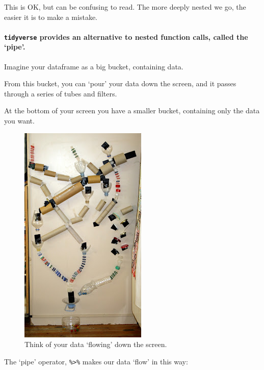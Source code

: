 \documentclass[]{article}
\let\oldparagraph\paragraph
\renewcommand{\paragraph}[1]{\oldparagraph{#1}\mbox{}}
\begin{document}
This is OK, but can be confusing to read. The more deeply nested we go, the
easier it is to make a mistake.

\hypertarget{tidyverse-provides-an-alternative-to-nested-function-calls-called-the-pipe.}{%
\paragraph{\texorpdfstring{\texttt{tidyverse} provides an alternative to nested function calls, called the `pipe'.}{tidyverse provides an alternative to nested function calls, called the `pipe'.}}\label{tidyverse-provides-an-alternative-to-nested-function-calls-called-the-pipe.}}

Imagine your dataframe as a big bucket, containing data.

From this bucket, you can `pour' your data down the screen, and it passes
through a series of tubes and filters.

At the bottom of your screen you have a smaller bucket, containing only the data
you want.

\begin{figure}
\centering
\includegraphics{media/tubes.jpg}
\caption{Think of your data `flowing' down the screen.}
\end{figure}

The `pipe' operator, \texttt{\%\textgreater{}\%} makes our data `flow' in this way:
\end{document}
